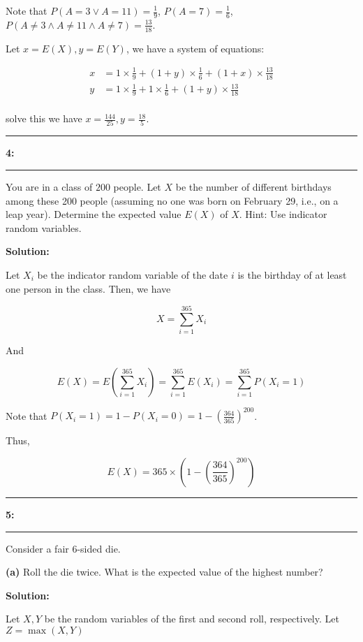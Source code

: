 \documentclass[11pt]{article}
\newcommand\question[2]{\vspace{.25in}\hrule\textbf{#1: #2}\vspace{.5em}\hrule\vspace{.10in}}
\renewcommand\part[1]{\vspace{.10in}\textbf{(#1)}}
\newcommand{\solution}{\vspace{.10in}\textbf{Solution: }}
\begin{document}
Note that $P(A = 3 \lor A=11) = \frac{1}{9}$, $P(A=7) = \frac{1}{6}$, $P(A \neq 3 \land A \neq 11 \land A \neq 7) = \frac{13}{18}$.

Let $x=E(X), y=E(Y)$, we have a system of equations:

\begin{align*}
    x &= 1 \times \frac{1}{9} + (1 + y) \times \frac{1}{6} + (1 + x) \times \frac{13}{18} \\
    y &= 1 \times \frac{1}{9} + 1 \times \frac{1}{6} + (1 + y) \times \frac{13}{18} \\
\end{align*}

solve this we have $x = \frac{144}{25}, y = \frac{18}{5}$.

\question{4}{}
You are in a class of $200$ people. Let $X$ be the number of different birthdays among these 200 people (assuming no one was born on February 29, i.e., on a leap year). Determine the expected value $E(X)$ of $X$.
Hint: Use indicator random variables.

\solution

Let $X_i$ be the indicator random variable of the date $i$ is the birthday of at least one person in the class.
Then, we have

\begin{equation}
    X = \sum_{i=1}^{365} X_i
\end{equation}

And

\begin{equation}
    E(X) = E\left(\sum_{i=1}^{365} X_i\right) = \sum_{i=1}^{365} E(X_i) = \sum_{i=1}^{365} P(X_i = 1)
\end{equation}

Note that $P(X_i = 1) = 1 - P(X_i = 0) = 1 - \left(\frac{364}{365}\right)^{200}$.

Thus,

\begin{equation}
    E(X) = 365 \times \left(1 - \left(\frac{364}{365}\right)^{200}\right)
\end{equation}

\question{5}{}
Consider a fair 6-sided die. 

\part{a} Roll the die twice. What is the expected value of the highest number?

\solution

Let $X, Y$ be the random variables of the first and second roll, respectively.
Let $Z = \max(X, Y)$
\end{document}

